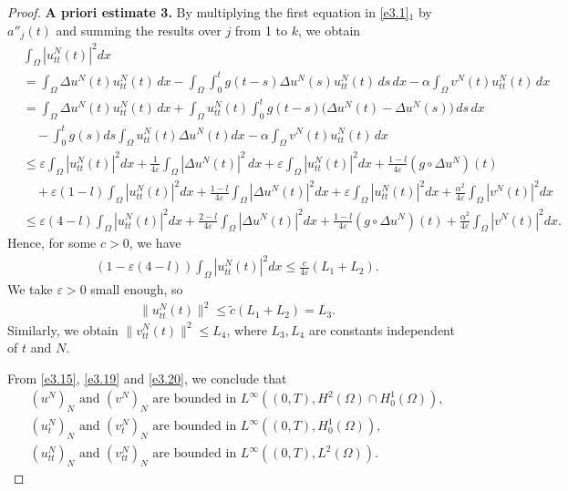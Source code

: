 \begin{proof}
\noindent\textbf{A priori estimate 3.}
 By multiplying the first equation in \eqref{e3.1}$_1$ by
 \(a''_j(t)\) and summing the results over \(j\) from 1 to \(k\), we obtain
\begin{align*}
&\int_\Omega |u_{tt}^N(t)|^2 dx \\
& = \int_\Omega \Delta u^N(t) u_{tt}^N(t) \, dx
 - \int_\Omega \int_0^t g(t-s) \Delta u^N(s) u_{tt}^N(t) \, ds\,dx
 - \alpha \int_\Omega v^N(t) u_{tt}^N(t) \, dx\\
& = \int_\Omega \Delta u^N(t) u_{tt}^N(t) \, dx
 + \int_\Omega u_{tt}^N(t) \int_0^t g(t-s) \Big(\Delta u^N(t)- \Delta u^N(s)\Big)\, ds\,dx\\
&\quad -\int_0^t g(s) ds \int_\Omega u_{tt}^N(t) \Delta u^N(t) dx
 - \alpha \int_\Omega v^N(t) u_{tt}^N(t) \, dx\\
&\leq \varepsilon \int_\Omega |u_{tt}^N(t)|^2 dx
 +\frac{1}{4\varepsilon}\int_\Omega |\Delta u^N(t)|^2 \, dx
 + \varepsilon \int_\Omega |u_{tt}^N(t)|^2 dx+\frac{1-l}{4\varepsilon}
 (g \circ \Delta u^N)(t)\\
&\quad +\varepsilon(1-l) \int_\Omega |u_{tt}^N(t)|^2 dx
 + \frac{1-l}{4\varepsilon} \int_\Omega |\Delta u^N(t)|^2dx
 + \varepsilon \int_\Omega |u_{tt}^N(t)|^2 dx
 +\frac{\alpha^2}{4\varepsilon}\int_\Omega |v^N(t)|^2 dx \\
&\leq \varepsilon (4-l)\int_\Omega |u_{tt}^N(t)|^2 dx
 +\frac{2-l}{4\varepsilon} \int_\Omega |\Delta u^N(t)|^2dx+
 \frac{1-l}{4\varepsilon} (g \circ \Delta u^N)(t)
 +\frac{\alpha^2}{4\varepsilon}\int_\Omega |v^N(t)|^2 dx.
\end{align*}
Hence, for some $c >0$, we have
\begin{align}
\left(1-\varepsilon(4-l)\right) \int_\Omega |u_{tt}^N(t)|^2 dx
\leq \frac{c}{4\varepsilon}(L_1+L_2).
\end{align}
We take $\varepsilon >0$ small enough, so
\begin{align}
\|u_{tt}^N(t)\|^2 \leq \tilde{c}(L_1+L_2)=L_3. \label{e3.20}
\end{align}
Similarly, we obtain $\|v_{tt}^N(t)\|^2 \leq L_4$, where $L_{3}, L_{4} $
are constants independent of $t$ and $N$.

From \eqref{e3.15}, \eqref{e3.19} and \eqref{e3.20}, we conclude that
\begin{equation} \label{e3.21}
\begin{gathered}
(u^{N})_{N} \text{ and } (v^N)_{N} \text{ are bounded in }
L^\infty((0,T), H^2(\Omega) \cap H_0^1 (\Omega)),\\
(u^N_{t})_{N} \text{ and } (v^N_{t})_{N} \text{ are bounded in }
L^\infty((0,T), H^1_0(\Omega)), \\
(u^N_{tt})_{N} \text{ and } (v^N_{tt})_{N} \text{ are bounded in }
 L^\infty((0,T), L^2(\Omega)).
\end{gathered}
\end{equation}


\end{proof}

